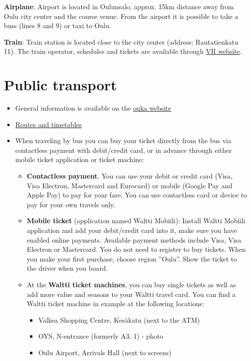 \documentclass[
  oneside]{book}
\providecommand{\tightlist}{%
  \setlength{\itemsep}{0pt}\setlength{\parskip}{0pt}}
\begin{document}
\textbf{Airplane}: Airport is located in Oulunsalo, approx. 15km distance away from
Oulu city center and the course venue. From the airport it is possible to take
a buss (lines 8 and 9) or taxi to Oulu.

\textbf{Train}: Train station is located close to the city center (address:
Rautatienkatu 11). The train operator, schedules and tickets are available
through \href{https://www.vr.fi/en}{VR website}.

\hypertarget{public-transport}{%
\section{Public transport}\label{public-transport}}

\begin{itemize}
\tightlist
\item
  General information is available on the \href{https://www.ouka.fi/oulu/public-transport/}{ouka website}
\item
  \href{https://www.ouka.fi/oulu/public-transport/routes-and-timetables/}{Routes and timetables}
\item
  When traveling by bus you can buy your ticket directly from the bus via contactless payment with
  debit/credit card, or in advance through either mobile ticket application or ticket machine:

  \begin{itemize}
  \tightlist
  \item
    \textbf{Contactless payment}. You can use your debit or credit card (Visa, Visa Electron, Mastercard and Eurocard) or mobile (Google Pay and Apple Pay) to pay for your fare. You can use contactless card or device to pay for your own travels only.
  \item
    \textbf{Mobile ticket} (application named Waltti Mobiili): Install Waltti Mobiili application and add your debit/credit card into it, make sure you have enabled online payments. Available payment methods include Visa, Visa Electron or Mastercard. You do not need to register to buy tickets. When you make your first purchase, choose region ''Oulu''. Show the ticket to the driver when you board.
  \item
    At the \textbf{Waltti ticket machines}, you can buy single tickets as well as add more value and seasons to your Waltti travel card. You can find a Waltti ticket machine in example at the following locations:

    \begin{itemize}
    \tightlist
    \item
      Valkea Shopping Centre, Kesäkatu (next to the ATM)
    \item
      OYS, N-entrance (formerly A3: 1) - photo
    \item
      Oulu Airport, Arrivals Hall (next to screens)
    \end{itemize}
  \end{itemize}
\end{itemize}
\end{document}
